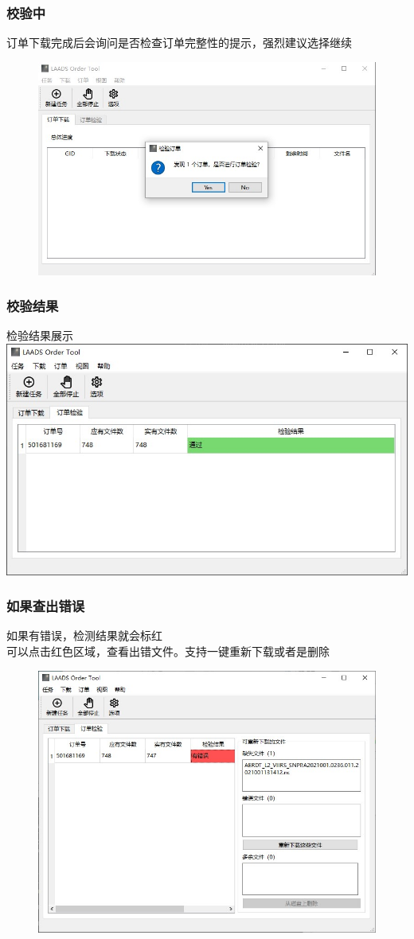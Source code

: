 \begin{frame}
    \frametitle{校验中}
    订单下载完成后会询问是否检查订单完整性的提示，强烈建议选择继续
    \begin{figure}
        \includegraphics[width=0.9\linewidth]{images/2B.12下载完成.jpg}
    \end{figure}

\end{frame}

\begin{frame}
    \frametitle{校验结果}
    检验结果展示
    \includegraphics[width=\linewidth]{images/2B.13校验结果.jpg}
\end{frame}

\begin{frame}
    \frametitle{如果查出错误}
    如果有错误，检测结果就会标红\\
    可以点击红色区域，查看出错文件。支持一键重新下载或者是删除
    \begin{figure}
        \includegraphics[width=0.7\linewidth]{images/2B.14有错误.jpg}
    \end{figure}

\end{frame}